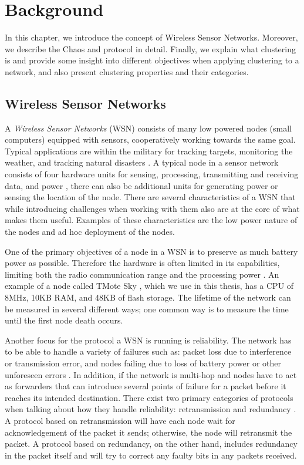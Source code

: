\chapter{Background}

\label{chap:background}
In this chapter, we introduce the concept of Wireless Sensor Networks. Moreover, we describe the Chaos and \atwo{} protocol in detail. Finally, we explain what clustering is and provide some insight into different objectives when applying clustering to a network, and also present clustering properties and their categories.


\section{Wireless Sensor Networks}
A \emph{Wireless Sensor Networks} (WSN) consists of many low powered nodes (small computers) equipped with sensors, cooperatively working towards the same goal. Typical applications are within the military for tracking targets, monitoring the weather, and tracking natural disasters \cite{Yick2008-wsn-survey}. A typical node in a sensor network consists of four hardware units for sensing, processing, transmitting and receiving data, and power \cite{Akyildiz2002-wsn-survey}, there can also be additional units for generating power or sensing the location of the node. There are several characteristics of a WSN that while introducing challenges when working with them also are at the core of what makes them useful. Examples of these characteristics are the low power nature of the nodes and ad hoc deployment of the nodes.


One of the primary objectives of a node in a WSN is to preserve as much battery power as possible. Therefore the hardware is often limited in its capabilities, limiting both the radio communication range and the processing power \cite{NikolaosA.Pantaziz2007-wsn-power-survey}. An example of a node called TMote Sky \cite{tmotesky-datasheet}, which we use in this thesis, has a CPU of 8MHz, 10KB RAM, and 48KB of flash storage. The lifetime of the network can be measured in several different ways; one common way is to measure the time until the first node death occurs.

Another focus for the protocol a WSN is running is reliability. The network has to be able to handle a variety of failures such as: packet loss due to interference or transmission error, and nodes failing due to loss of battery power or other unforeseen errors \cite{Mahmood2015-reliability-survey}. In addition, if the network is multi-hop and nodes have to act as forwarders that can introduce several points of failure for a packet before it reaches its intended destination. There exist two primary categories of protocols when talking about how they handle reliability: retransmission and redundancy \cite{Mahmood2015-reliability-survey}. A protocol based on retransmission will have each node wait for acknowledgement of the packet it sends; otherwise, the node will retransmit the packet. A protocol based on redundancy, on the other hand, includes redundancy in the packet itself and will try to correct any faulty bits in any packets received.



